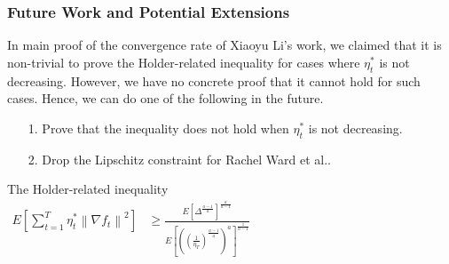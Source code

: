 \documentclass{beamer}
\begin{document}
\begin{frame}
\frametitle{Future Work and Potential Extensions}
In main proof of the convergence rate of Xiaoyu Li's work, we claimed that it is non-trivial to prove the Holder-related inequality for cases where $\eta_t^*$ is not decreasing. However, we have no concrete proof that it cannot hold for such cases. Hence, we can do one of the following in the future.
\begin{enumerate}
        \item [1.] Prove that the inequality does not hold when $\eta_t^*$ is not decreasing.
        \item [2.] Drop the Lipschitz constraint for Rachel Ward et al..
        
\end{enumerate}

The Holder-related inequality\\
$\begin{aligned} E\left[\sum_{t=1}^T \eta_t^*\left\|\nabla f_t\right\|^2\right] & \geq \frac{E\left[\Delta^{\frac{a-1}{a}}\right]^{\frac{a}{a-1}}}{E\left[\left(\left(\frac{1}{\eta_T}\right)^{\frac{a-1}{a}}\right)^{a}\right]^{\frac{1}{a-1}}}\end{aligned}$
\end{frame}
\end{document}
